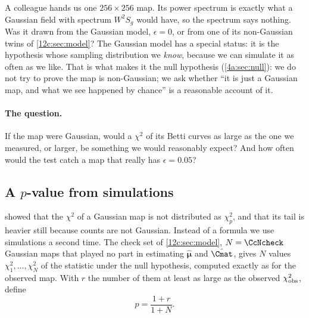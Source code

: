 A colleague hands us one $256\times256$ map. Its power spectrum is exactly what a Gaussian field with spectrum $W^2S_g$
would have, so the spectrum says nothing. Was it drawn from the Gaussian model, $\epsilon=0$, or from one of its
non-Gaussian twins of \cref{12c:sec:model}? The Gaussian model has a special status: it is the hypothesis whose sampling
distribution we \emph{know}, because we can simulate it as often as we like. That is what makes it the null hypothesis
(\cref{4a:sec:null}): we do not try to prove the map is non-Gaussian; we ask whether ``it is just a Gaussian map, and what we
see happened by chance'' is a reasonable account of it.

\paragraph{The question.} If the map were Gaussian, would a $\chi^2$ of its Betti curves as large as the one we measured,
or larger, be something we would reasonably expect? And how often would the test catch a map that really has
$\epsilon=0.05$?

\subsection{A $p$-value from simulations}
\label{12c:sec:simp}

 showed that the $\chi^2$ of a Gaussian map is not distributed as $\chi^2_p$, and that its tail is
heavier still because counts are not Gaussian. Instead of a formula we use simulations a second time. The check set of
\cref{12c:sec:model}, $N=\CcNcheck$ Gaussian maps that played no part in estimating $\hat{\bm\mu}$ and $\hat\Cmat$, gives
$N$ values $\chi^2_1,\dots,\chi^2_N$ of the statistic under the null hypothesis, computed exactly as for the observed map.
With $r$ the number of them at least as large as the observed $\chi^2_{\rm obs}$, define
\begin{equation}
  p=\frac{1+r}{1+N} .
  \label{12c:eq:psim}
\end{equation}

